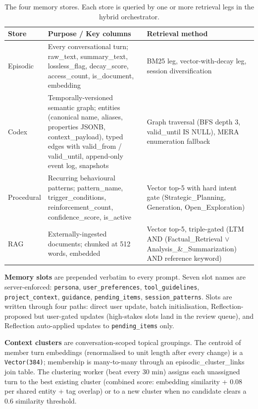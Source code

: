 \documentclass[11pt,a4paper]{article}
\begin{document}
\begin{table}[htbp]
\centering
\small
\caption{The four memory stores. Each store is queried by one or more retrieval legs in the hybrid orchestrator.}
\label{tab:stores}
\begin{tabular}{p{}p{}p{}}
\toprule
\textbf{Store} & \textbf{Purpose / Key columns} & \textbf{Retrieval method} \\
\midrule
Episodic & Every conversational turn; raw\_text, summary\_text, lossless\_flag, decay\_score, access\_count, is\_document, embedding & BM25 leg, vector-with-decay leg, session diversification \\
Codex & Temporally-versioned semantic graph; entities (canonical name, aliases, properties JSONB, context\_payload), typed edges with valid\_from / valid\_until, append-only event log, snapshots & Graph traversal (BFS depth 3, valid\_until IS NULL), MERA enumeration fallback \\
Procedural & Recurring behavioural patterns; pattern\_name, trigger\_conditions, reinforcement\_count, confidence\_score, is\_active & Vector top-5 with hard intent gate (Strategic\_Planning, Generation, Open\_Exploration) \\
RAG & Externally-ingested documents; chunked at 512 words, embedded & Vector top-5, triple-gated (LTM AND (Factual\_Retrieval $\lor$ Analysis\_\&\_Summarization) AND reference keyword) \\
\bottomrule
\end{tabular}
\end{table}

\textbf{Memory slots} are prepended verbatim to every prompt. Seven slot names are server-enforced: \texttt{persona}, \texttt{user\_preferences}, \texttt{tool\_guidelines}, \texttt{project\_context}, \texttt{guidance}, \texttt{pending\_items}, \texttt{session\_patterns}. Slots are written through four paths: direct user update, batch initialisation, Reflection-proposed but user-gated updates (high-stakes slots land in the review queue), and Reflection auto-applied updates to \texttt{pending\_items} only.

\textbf{Context clusters} are conversation-scoped topical groupings. The centroid of member turn embeddings (renormalised to unit length after every change) is a \texttt{Vector(384)}; membership is many-to-many through an episodic\_cluster\_links join table. The clustering worker (beat every 30 min) assigns each unassigned turn to the best existing cluster (combined score: embedding similarity + 0.08 per shared entity + tag overlap) or to a new cluster when no candidate clears a 0.6 similarity threshold.
\end{document}
